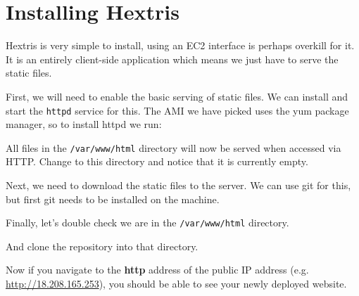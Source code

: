 \documentclass{csse4400}
\begin{document}
\section{Installing Hextris}
Hextris is very simple to install, using an EC2 interface is perhaps overkill for it.
It is an entirely client-side application which means we just have to serve the static files.

First, we will need to enable the basic serving of static files.
We can install and start the \texttt{httpd} service for this.
The AMI we have picked uses the yum package manager, so to install httpd we run:


All files in the \texttt{/var/www/html} directory will now be served when accessed via HTTP.
Change to this directory and notice that it is currently empty.

Next, we need to download the static files to the server.
We can use git for this, but first git needs to be installed on the machine.


Finally, let's double check we are in the \texttt{/var/www/html} directory.



And clone the repository into that directory.



Now if you navigate to the \textbf{http} address of the public IP address (e.g. \url{http://18.208.165.253}), you should be able to see your newly deployed website.
\end{document}
